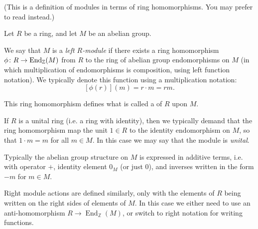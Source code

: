 \documentclass[12pt]{article}
\begin{document}

(This is a definition of modules in terms of ring homomorphisms. You may prefer to read  instead.)

Let $R$ be a ring, 
and let $M$ be an abelian group.

We say that $M$ is a {\it left $R$-module}
if there exists a ring homomorphism $\phi\colon R \to {\rm End}_{\Bbb{Z}}(M)$ 
from $R$ to the ring of abelian group endomorphisms on $M$
(in which multiplication of endomorphisms is composition,
using left function notation).
We typically denote this function using a multiplication notation:
$$[\phi(r)](m) = r \cdot m = rm.$$

This ring homomorphism defines 
what is called a {}
of $R$ upon $M$.

If $R$ is a unital ring 
(i.e. a ring with identity),
then we typically demand
that the ring homomorphism
map the unit $1 \in R$
to the identity endomorphism on $M$,
so that $1 \cdot m = m$ for all $m \in M$.
In this case we may say 
that the module is \emph{unital}.

Typically the abelian group structure on $M$
is expressed in additive terms,
i.e. with operator $+$, 
identity element $0_M$ (or just $0$),
and inverses written in 
the form $-m$ for $m \in M$.


%
%
%
%
%
%
%
%
%

Right module actions are defined similarly,
only with the elements of $R$ being written
on the right sides of elements of $M$.
In this case we either need to use 
an anti-homomorphism $R \to \operatorname{End}_{\mathbb{Z}}(M)$,
or switch to right notation for writing functions.
\end{document}
